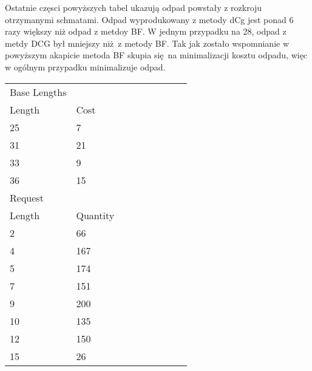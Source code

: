 Ostatnie częsci powyższych tabel ukazują odpad powstały z rozkroju otrzymanymi schmatami. Odpad wyprodukowany z metody dCg jest ponad 6 razy większy niż odpad z metdoy BF. W jednym przypadku na 28, odpad z metdy DCG był mniejszy niż z metody BF. Tak jak zostało wspomnianie w powyższym akapicie metoda BF skupia się na minimalizacji kosztu odpadu, więc w ogólnym przypadku minimalizuje odpad.   

\begin{longtable}{lllllllll}
Base Lengths             &              &           &                  &    &    &    &   &    \\
Length                   & Cost         &           &                  &    &    &    &   &    \\
25                       & 7            &           &                  &    &    &    &   &    \\
31                       & 21           &           &                  &    &    &    &   &    \\
33                       & 9            &           &                  &    &    &    &   &    \\
36                       & 15           &           &                  &    &    &    &   &    \\
Request     &              &           &                  &    &    &    &   &    \\
Length                   & Quantity     &           &                  &    &    &    &   &    \\
2                        & 66           &           &                  &    &    &    &   &    \\
4                        & 167          &           &                  &    &    &    &   &    \\
5                        & 174          &           &                  &    &    &    &   &    \\
7                        & 151          &           &                  &    &    &    &   &    \\
9                        & 200          &           &                  &    &    &    &   &    \\
10                       & 135          &           &                  &    &    &    &   &    \\
12                       & 150          &           &                  &    &    &    &   &    \\
15                       & 26           &           &                  &    &    &    &   &    \\

\end{longtable}

